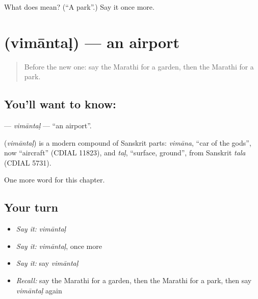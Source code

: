 \begin{tcolorbox}[breakable,colback=teal!4,colframe=teal!35!black,title={Before you move on}]
What does  mean? (\textquotedblleft{}A park\textquotedblright{}.) Say it once more.
\end{tcolorbox}
\section[\texorpdfstring{\mr{विमानतळ} (vimāntaḷ)}{विमानतळ (vimāntaḷ)}]{ (vimāntaḷ) — an airport}

\label{lesson:MR-C128-vimantal}



\begin{quote}
Before the new one: say the Marathi for a garden, then the Marathi for a park.
\end{quote}

\subsection*{You'll want to know: }
\textbf{} — \emph{vimāntaḷ} — \textquotedblleft{}an airport\textquotedblright{}.

\begin{cousinweb}
\textbf{} (\emph{vimāntaḷ}) is a modern compound of Sanskrit parts: \emph{vimāna}, \textquotedblleft{}car of the gods\textquotedblright{}, now \textquotedblleft{}aircraft\textquotedblright{} (CDIAL 11823), and \emph{taḷ}, \textquotedblleft{}surface, ground\textquotedblright{}, from Sanskrit \emph{tala} (CDIAL 5731).
\end{cousinweb}

\begin{grammarlens}[title={What you've built}]
One more word for this chapter.
\end{grammarlens}

\subsection*{Your turn}
\begin{itemize}
\raggedright
  \item \emph{Say it:} \emph{vimāntaḷ}
  \item \emph{Say it:} \emph{vimāntaḷ}, once more
  \item \emph{Say it:} say \emph{vimāntaḷ}
  \item \emph{Recall:} say the Marathi for a garden, then the Marathi for a park, then say \emph{vimāntaḷ} again
\end{itemize}

